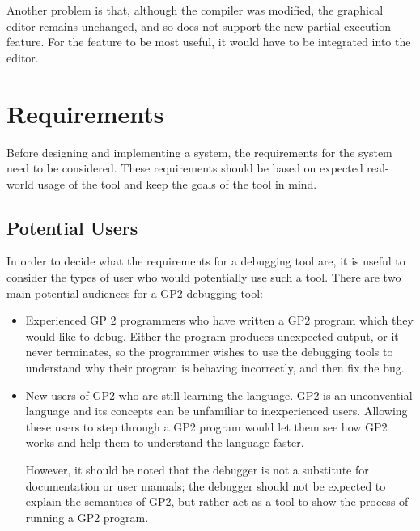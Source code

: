 \documentclass[authoryearcitations]{UoYCSproject}
\begin{document}
Another problem is that, although the compiler was modified, the graphical editor
remains unchanged, and so does not support the new partial execution feature.
For the feature to be most useful, it would have to be integrated into the editor.


\clearpage


\chapter{Requirements}
\label{cha:Requirements}

Before designing and implementing a system, the requirements for the system need
to be considered. These requirements should be based on expected real-world usage
of the tool and keep the goals of the tool in mind.

\section{Potential Users}
\label{sec:Potential Users}

In order to decide what the requirements for a debugging tool are, it is useful
to consider the types of user who would potentially use such a tool. There are
two main potential audiences for a GP2 debugging tool:

\begin{itemize}
    \item Experienced GP 2 programmers who have written a GP2 program which they
          would like to debug. Either the program produces unexpected output,
          or it never terminates, so the programmer wishes to use the debugging
          tools to understand why their program is behaving incorrectly, and
          then fix the bug.

    \item New users of GP2 who are still learning the language. GP2 is an
          unconvential language and its concepts can be unfamiliar to
          inexperienced users. Allowing these users to step through a GP2
          program would let them see how GP2 works and help them to understand
          the language faster.

          However, it should be noted that the debugger is not a substitute for
          documentation or user manuals; the debugger should not be expected to
          explain the semantics of GP2, but rather act as a tool to show the
          process of running a GP2 program.
\end{itemize}
\end{document}

